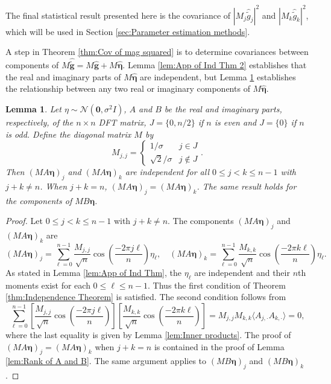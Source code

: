 \documentclass[12pt]{article}
\newcommand{\gVec}{\mathbf{g}}	%
\newcommand{\gnoise}{\widetilde{g}}	%
\newcommand{\gnoiseVec}{\widetilde{\mathbf{g}}}	%
\newcommand{\noise}{\eta}	%
\newcommand{\noiseSD}{\sigma}	%
\newcommand{\noiseVec}{\bm{\noise}}	%
\newtheorem{lemma}{Lemma}[section]
\begin{document}
The final statistical result presented here is the covariance of $|M_j\widehat{\gnoise}_j|^2$ and $|M_k\widehat{\gnoise}_k|^2$, which will be used in Section \ref{sec:Parameter estimation methods}.  

A step in Theorem \ref{thm:Cov of mag squared} is to determine covariances between components of $M\widehat{\gnoiseVec} = M\widehat{\gVec} + M\widehat{\noiseVec}$. Lemma \ref{lem:App of Ind Thm 2} establishes that the real and imaginary parts of $M\widehat{\noiseVec}$ are independent, but Lemma \ref{lem:App of Ind Thm 3} establishes the relationship between any two real or imaginary components of $M\widehat{\noiseVec}$.

\begin{lemma}
\label{lem:App of Ind Thm 3}
Let $\noise \sim \mathcal{N}(\bm{0},\noiseSD^2 I)$, $A$ and $B$ be the real and imaginary parts, respectively, of the $n \times n$ DFT matrix, $J = \{0,n/2\}$ if $n$ is even and $J = \{0\}$ if $n$ is odd. Define the diagonal matrix $M$ by
\[M_{j,j} = \begin{cases}
1/\noiseSD & j \in J \\
\sqrt{2}/\noiseSD & j \not\in J
\end{cases}.\]
Then $(MA\noiseVec)_j$ and $(MA\noiseVec)_k$ are independent for all $0 \leq j < k \leq n-1$ with $j + k \neq n$. When $j + k = n$, $(MA\noiseVec)_j = (MA\noiseVec)_k$. The same result holds for the components of $MB\noiseVec$.
\end{lemma}
\begin{proof}
Let $0 \leq j < k \leq n-1$ with $j + k \neq n$. The components $(MA\noiseVec)_j$ and $(MA\noiseVec)_k$ are
\[(MA\noiseVec)_j = \sum_{\ell=0}^{n-1} \frac{M_{j,j}}{\sqrt{n}}\cos\left(\frac{-2\pi{j\ell}}{n}\right)\noise_{\ell}, \quad (MA\noiseVec)_k = \sum_{\ell=0}^{n-1} \frac{M_{k,k}}{\sqrt{n}}\cos\left(\frac{-2\pi{k\ell}}{n}\right)\noise_{\ell}.\]
As stated in Lemma \ref{lem:App of Ind Thm}, the $\noise_\ell$ are independent and their $n$th moments exist for each $0 \leq \ell \leq n-1$. Thus the first condition of Theorem \ref{thm:Independence Theorem} is satisfied. The second condition follows from
\[\sum_{\ell=0}^{n-1} \left[\frac{M_{j,j}}{\sqrt{n}}\cos\left(\frac{-2\pi{j\ell}}{n}\right)\right]\left[\frac{M_{k,k}}{\sqrt{n}}\cos\left(\frac{-2\pi{k\ell}}{n}\right)\right] = M_{j,j}M_{k,k} \langle A_{j,\cdot}A_{k,\cdot} \rangle = 0,\]
where the last equality is given by Lemma \ref{lem:Inner products}. The proof of $(MA\noiseVec)_j = (MA\noiseVec)_k$ when $j+k = n$ is contained in the proof of Lemma \ref{lem:Rank of A and B}. The same argument applies to $(MB\noiseVec)_j$ and $(MB\noiseVec)_k$.
\end{proof}
\end{document}
